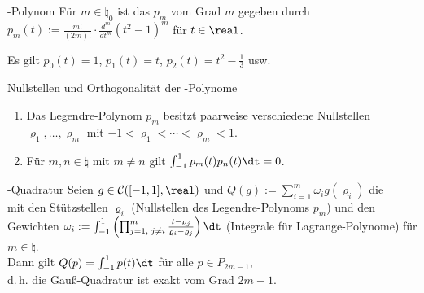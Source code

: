 \linie
\pagebreak

\begin{Def}{-Polynom}
    Für $m \in \natural_0$ ist das  $p_m$
    vom Grad $m$ gegeben durch
    $p_m(t) := \frac{m!}{(2m)!} \cdot \frac{d^m}{dt^m} (t^2 - 1)^m$
    für $t \in \real$.
\end{Def}

\begin{Bsp}
    Es gilt $p_0(t) = 1$,
    $p_1(t) = t$,
    $p_2(t) = t^2 - \frac{1}{3}$ usw.
\end{Bsp}

\begin{Lemma}{Nullstellen und Orthogonalität der -Polynome}
    \begin{enumerate}
        \item
        Das Legendre-Polynom $p_m$ besitzt paarweise verschiedene Nullstellen\\
        $\varrho_1, \dotsc, \varrho_m$ mit
        $-1 < \varrho_1 < \dotsb < \varrho_m < 1$.

        \item
        Für $m, n \in \natural$ mit $m \not= n$ gilt
        $\int_{-1}^1 p_m(t) p_n(t) \dt = 0$.
    \end{enumerate}
\end{Lemma}

\begin{Satz}{-Quadratur}
    Seien $g \in \C([-1, 1], \real)$ und
    $Q(g) := \sum_{i=1}^m \omega_i g(\varrho_i)$
    die\\
     mit
    den Stützstellen $\varrho_i$ (Nullstellen des Legendre-Polynoms $p_m$)
    und den Gewichten $\omega_i := \int_{-1}^1 \left(\prod_{j=1,\;j\not=i}^m
    \frac{t - \varrho_j}{\varrho_i - \varrho_j}\right) \dt$
    (Integrale für Lagrange-Polynome) für $m \in \natural$.\\
    Dann gilt $Q(p) = \int_{-1}^1 p(t)\dt$ für alle $p \in P_{2m-1}$,\\
    d.\,h. die Gauß-Quadratur ist exakt vom Grad $2m - 1$.
\end{Satz}

\linie

